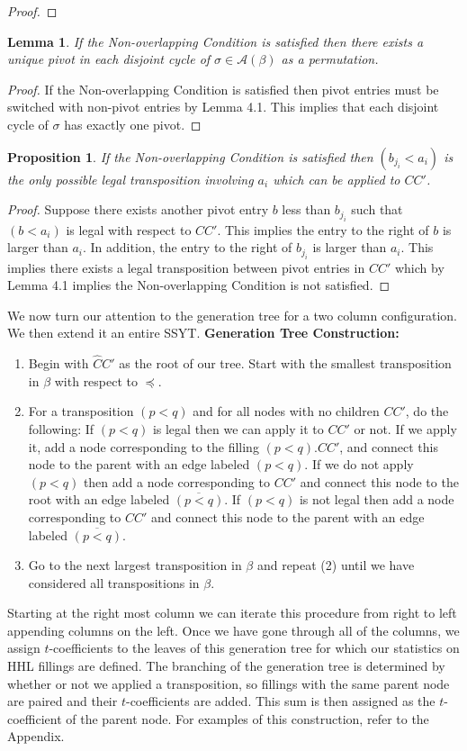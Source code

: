 \documentclass[11pt]{amsart}
\newtheorem{prop}{Proposition}[section]
\newtheorem{lemma}{Lemma}[section]
\begin{document}
{\begin{proof}
\end{proof}
\begin{lemma}If the Non-overlapping Condition is satisfied then there exists a unique pivot in each disjoint cycle of $\sigma\in \mathcal{A}(\beta)$ as a permutation. 
\end{lemma}
\begin{proof}
If the Non-overlapping Condition is satisfied then pivot entries must be switched with non-pivot entries by Lemma 4.1. This implies that each disjoint cycle of $\sigma$ has exactly one pivot.
\end{proof}
\begin{prop}
If the Non-overlapping Condition is satisfied then $(b_{j_{i}}<a_{i})$ is the only possible legal transposition involving $a_{i}$ which can be applied to $CC'$.
\end{prop}
\begin{proof}
Suppose there exists another pivot entry $b$ less than $b_{j_{i}}$ such that $(b<a_{i})$ is legal with respect to $CC'$. This implies the entry to the right of $b$ is larger than $a_{i}$. In addition, the entry to the right of $b_{j_{i}}$ is larger than $a_{i}$. This implies there exists a legal transposition between pivot entries in $CC'$ which by Lemma 4.1 implies the Non-overlapping Condition is not satisfied.
\end{proof}

We now turn our attention to the generation tree for a two column configuration. We then extend it an entire SSYT.
\newline\textbf{Generation Tree Construction: }
\begin{enumerate}
\item Begin with $\widehat{C}C'$ as the root of our tree. Start with the smallest transposition in $\beta$ with respect to $\preceq$.
\item For a transposition $(p<q)$ and for all nodes with no children $CC'$, do the following: If $(p<q)$ is legal then we can apply it to $CC'$ or not. If we apply it, add a node corresponding to the filling $(p<q).CC'$, and connect this node to the parent with an edge labeled $(p<q)$. If we do not apply $(p<q)$ then add a node corresponding to $CC'$ and connect this node to the root with an edge labeled $\overline{(p<q)}$. If $(p<q)$ is not legal then add a node corresponding to $CC'$ and connect this node to the parent with an edge labeled $\overline{(p<q)}$. 
\item Go to the next largest transposition in $\beta$ and repeat (2) until we have considered all transpositions in $\beta$.
\end{enumerate}
\indent Starting at the right most column we can iterate this procedure from right to left appending columns on the left. Once we have gone through all of the columns, we assign $t$-coefficients to the leaves of this generation tree for which our statistics on HHL fillings are defined. The branching of the generation tree is determined by whether or not we applied a transposition, so fillings with the same parent node are paired and their $t$-coefficients are added. This sum is then assigned as the $t$-coefficient of the parent node. For examples of this construction, refer to the Appendix. 
}
\end{document}
